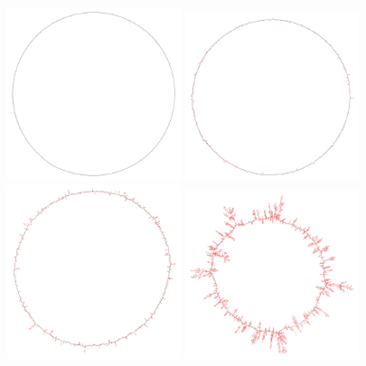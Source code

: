 \documentclass[12pt]{article}
\begin{document}
\begin{figure}
\includegraphics[width=2in]{f3b001}
\includegraphics[width=2in]{f3b005}
\newline
\includegraphics[width=2in]{f3b010}
\includegraphics[width=2in]{f3b015}

\label{fig:circles}
\end{figure}
\end{document}
